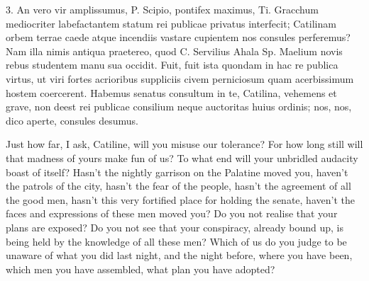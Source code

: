 {  %
  3. An vero vir amplissumus, P. Scipio, pontifex maximus, Ti. Gracchum mediocriter labefactantem statum rei publicae privatus interfecit; Catilinam orbem terrae caede atque incendiis vastare cupientem nos consules perferemus? Nam illa nimis antiqua praetereo, quod C. Servilius Ahala Sp. Maelium novis rebus studentem manu sua occidit. Fuit, fuit ista quondam in hac re publica virtus, ut viri fortes acrioribus suppliciis civem perniciosum quam acerbissimum hostem coercerent. Habemus senatus consultum in te, Catilina, vehemens et grave, non deest rei publicae consilium neque auctoritas huius ordinis; nos, nos, dico aperte, consules desumus.
}{
  Just how far, I ask, Catiline, will you misuse our tolerance? For how long still will that madness of yours make fun of us? To what end will your unbridled audacity boast of itself? Hasn’t the nightly garrison on the Palatine moved you, haven’t the patrols of the city, hasn’t the fear of the people, hasn’t the agreement of all the good men, hasn’t this very fortified place for holding the senate, haven’t the faces and expressions of these men moved you? Do you not realise that your plans are exposed? Do you not see that your conspiracy, already bound up, is being held by the knowledge of all these men? Which of us do you judge to be unaware of what you did last night, and the night before, where you have been, which men you have assembled, what plan you have adopted?

}
